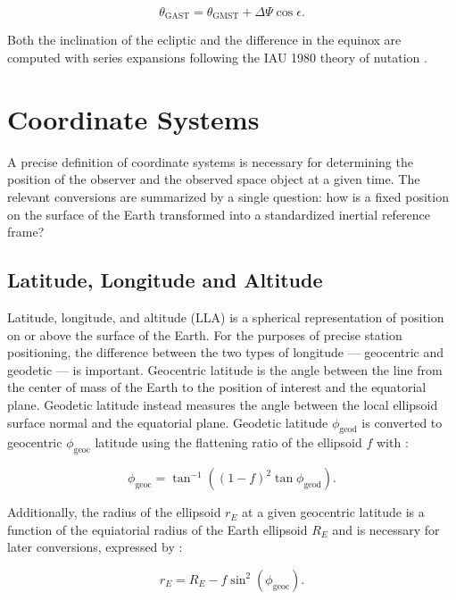\begin{equation} \label{eq:date_to_gast}
  \theta_\mathrm{GAST} = \theta_\mathrm{GMST} + \Delta \Psi \cos\epsilon.
\end{equation}

Both the inclination of the ecliptic and the difference in the equinox are computed with series expansions following the IAU 1980 theory of nutation \cite{vallado4ed}.

\section{Coordinate Systems}

A precise definition of coordinate systems is necessary for determining the position of the observer and the observed space object at a given time. The relevant conversions are summarized by a single question: how is a fixed position on the surface of the Earth transformed into a standardized inertial reference frame?

\subsection{Latitude, Longitude and Altitude}

Latitude, longitude, and altitude (LLA) is a spherical representation of position on or above the surface of the Earth. For the purposes of precise station positioning, the difference between the two types of longitude --- geocentric and geodetic --- is important. Geocentric latitude is the angle between the line from the center of mass of the Earth to the position of interest and the equatorial plane. Geodetic latitude instead measures the angle between the local ellipsoid surface normal and the equatorial plane. Geodetic latitude $\phi_\mathrm{geod}$ is converted to geocentric $\phi_\mathrm{geoc}$ latitude using the flattening ratio of the ellipsoid $f$ with \cite{frueh2019notes}:

\begin{equation} \label{eq:geod_to_geoc}
  \phi_\mathrm{geoc} = \tan^{-1} \left((1 - f)^2 \tan\phi_\mathrm{geod} \right).
\end{equation}

Additionally, the radius of the ellipsoid $r_E$ at a given geocentric latitude is a function of the equiatorial radius of the Earth ellipsoid $R_E$ and is necessary for later conversions, expressed by \cite{frueh2019notes}:

\begin{equation} \label{eq:rad_at_geoc}
  r_E = R_E - f \sin^2 \left( \phi_\mathrm{geoc} \right).
\end{equation}

